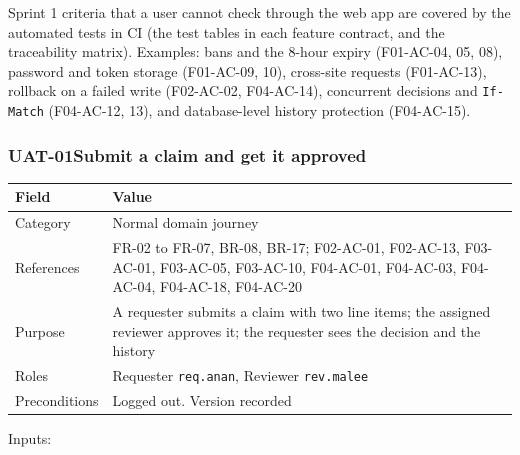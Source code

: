 Sprint 1 criteria that a user cannot check through the web app are covered by the automated tests in CI (the test tables in each feature contract, and the traceability matrix). Examples: bans and the 8-hour expiry (F01-AC-04, 05, 08), password and token storage (F01-AC-09, 10), cross-site requests (F01-AC-13), rollback on a failed write (F02-AC-02, F04-AC-14), concurrent decisions and \texttt{If-Match} (F04-AC-12, 13), and database-level history protection (F04-AC-15).


\subsubsection*{UAT-01\enspace Submit a claim and get it approved}\label{case:UAT-01}

{\def\LTcaptype{none} %
\begin{longtable}[]{@{}
  >{\raggedright\arraybackslash}p{}
  >{\raggedright\arraybackslash}p{}@{}}
\toprule\noalign{}
\begin{minipage}[b]{\linewidth}\raggedright
Field
\end{minipage} & \begin{minipage}[b]{\linewidth}\raggedright
Value
\end{minipage} \\
\midrule\noalign{}
\endhead
\bottomrule\noalign{}
\endlastfoot
Category & Normal domain journey \\
References & FR-02 to FR-07, BR-08, BR-17; F02-AC-01, F02-AC-13, F03-AC-01, F03-AC-05, F03-AC-10, F04-AC-01, F04-AC-03, F04-AC-04, F04-AC-18, F04-AC-20 \\
Purpose & A requester submits a claim with two line items; the assigned reviewer approves it; the requester sees the decision and the history \\
Roles & Requester \texttt{req.anan}, Reviewer \texttt{rev.malee} \\
Preconditions & Logged out. Version recorded \\
\end{longtable}
}

Inputs:

